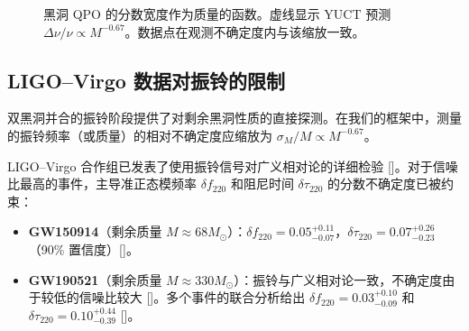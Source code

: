 \documentclass[12pt,a4paper]{article}
\begin{document}
	\begin{figure}[htbp]
		\centering
		\caption{黑洞 QPO 的分数宽度作为质量的函数。虚线显示 YUCT 预测 \(\Delta\nu/\nu \propto M^{-0.67}\)。数据点在观测不确定度内与该缩放一致。}
		\label{fig:qpo_scaling}
	\end{figure}
	
	\subsection{LIGO–Virgo 数据对振铃的限制}
	
	双黑洞并合的振铃阶段提供了对剩余黑洞性质的直接探测。在我们的框架中，测量的振铃频率（或质量）的相对不确定度应缩放为 \(\sigma_M/M \propto M^{-0.67}\)。
	
	LIGO–Virgo 合作组已发表了使用振铃信号对广义相对论的详细检验 [\cite{LIGO2021, Ghosh2021}]。对于信噪比最高的事件，主导准正态模频率 \(\delta f_{220}\) 和阻尼时间 \(\delta \tau_{220}\) 的分数不确定度已被约束：
	
	\begin{itemize}
		\item \textbf{GW150914}（剩余质量 \(M \approx 68 M_\odot\)）：\(\delta f_{220} = 0.05^{+0.11}_{-0.07}\)，\(\delta \tau_{220} = 0.07^{+0.26}_{-0.23}\)（90\% 置信度）[\cite{Ghosh2021}]。
		\item \textbf{GW190521}（剩余质量 \(M \approx 330 M_\odot\)）：振铃与广义相对论一致，不确定度由于较低的信噪比较大 [\cite{Abbott2020b}]。多个事件的联合分析给出 \(\delta f_{220} = 0.03^{+0.10}_{-0.09}\) 和 \(\delta \tau_{220} = 0.10^{+0.44}_{-0.39}\) [\cite{Ghosh2021}]。
	\end{itemize}
	
\end{document}
